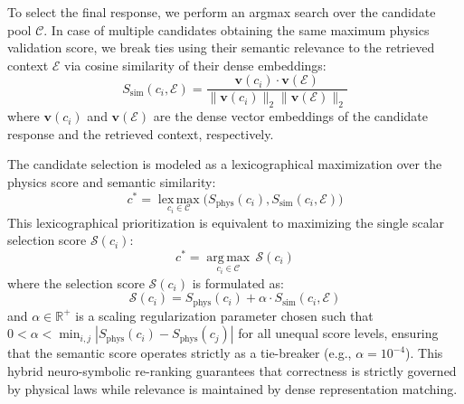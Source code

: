 \documentclass[a4paper,fleqn]{cas-sc}
\begin{document}
To select the final response, we perform an argmax search over the candidate pool $\mathcal{C}$. In case of multiple candidates obtaining the same maximum physics validation score, we break ties using their semantic relevance to the retrieved context $\mathcal{E}$ via cosine similarity of their dense embeddings:
\begin{equation*}
S_{\mathrm{sim}}(c_i, \mathcal{E}) = \frac{\mathbf{v}(c_i) \cdot \mathbf{v}(\mathcal{E})}{\|\mathbf{v}(c_i)\|_2 \|\mathbf{v}(\mathcal{E})\|_2}
\end{equation*}
where $\mathbf{v}(c_i)$ and $\mathbf{v}(\mathcal{E})$ are the dense vector embeddings of the candidate response and the retrieved context, respectively.

The candidate selection is modeled as a lexicographical maximization over the physics score and semantic similarity:
\begin{equation*}
c^* = \operatorname*{lex\,max}_{c_i \in \mathcal{C}} \Big( S_{\mathrm{phys}}(c_i), S_{\mathrm{sim}}(c_i, \mathcal{E}) \Big)
\end{equation*}
This lexicographical prioritization is equivalent to maximizing the single scalar selection score $\mathcal{S}(c_i)$:
\begin{equation*}
c^* = \underset{c_i \in \mathcal{C}}{\operatorname{arg\,max}} \, \mathcal{S}(c_i)
\end{equation*}
where the selection score $\mathcal{S}(c_i)$ is formulated as:
\begin{equation*}
\mathcal{S}(c_i) = S_{\mathrm{phys}}(c_i) + \alpha \cdot S_{\mathrm{sim}}(c_i, \mathcal{E})
\end{equation*}
and $\alpha \in \mathbb{R}^+$ is a scaling regularization parameter chosen such that $0 < \alpha < \min_{i, j} |S_{\mathrm{phys}}(c_i) - S_{\mathrm{phys}}(c_j)|$ for all unequal score levels, ensuring that the semantic score operates strictly as a tie-breaker (e.g., $\alpha = 10^{-4}$). This hybrid neuro-symbolic re-ranking guarantees that correctness is strictly governed by physical laws while relevance is maintained by dense representation matching.
\end{document}
